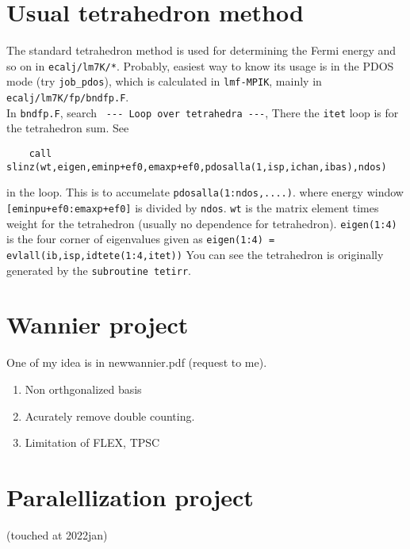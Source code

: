 \documentclass[a4paper,10pt,fleqn]{article}
\begin{document}
\section{Usual tetrahedron method}
The standard tetrahedron method is used for determining the Fermi energy
and so on in \verb#ecalj/lm7K/*#.
Probably, easiest way to know its usage is in the PDOS mode (try
\verb#job_pdos#), which is calculated in \verb#lmf-MPIK#, mainly in \verb#ecalj/lm7K/fp/bndfp.F#.\\
In \verb#bndfp.F#, search \verb# --- Loop over tetrahedra ---#,
There the \verb#itet# loop is for the tetrahedron sum. See 
\begin{verbatim}
	call slinz(wt,eigen,eminp+ef0,emaxp+ef0,pdosalla(1,isp,ichan,ibas),ndos)
\end{verbatim}
in the loop. This is to accumelate \verb#pdosalla(1:ndos,....)#.
where energy window \verb#[eminpu+ef0:emaxp+ef0]# is divided by
\verb#ndos#. \verb#wt# is the matrix element times weight for the
tetrahedron (usually no dependence for tetrahedron).
\verb#eigen(1:4)# is the four corner of eigenvalues given as 
\verb#eigen(1:4) = evlall(ib,isp,idtete(1:4,itet))#
You can see the tetrahedron is originally generated by the
\verb#subroutine tetirr#.


\section{Wannier project}
One of my idea is in newwannier.pdf (request to me).

\begin{enumerate}
\item
   Non orthgonalized basis
\item
   Acurately remove double counting.
\item
   Limitation of FLEX, TPSC
\end{enumerate}

\section{Paralellization project}
\newpage
\appendix
{} 
(touched at 2022jan)  
\end{document}
